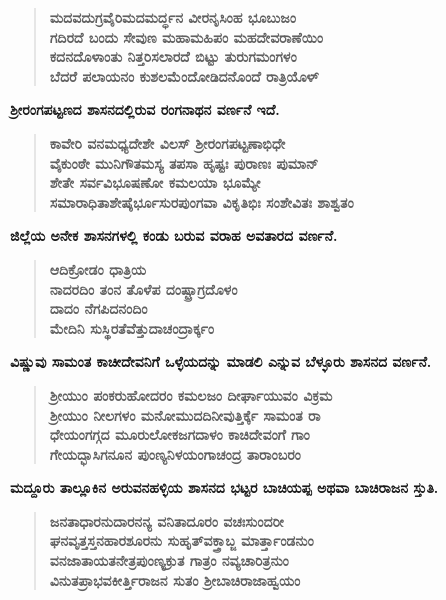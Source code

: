 \begin{verse}
\textbf{ಮದವದುಗ್ರವೈರಿಮದಮರ್ದ್ಧನ ವೀರನೃಸಿಂಹ ಭೂಬುಜಂ \\ ಗದಿರದೆ ಬಂದು ಸೇವುಣ ಮಹಾಮಹಿಪಂ ಮಹದೇವರಾಣೆಯಿಂ \\ ಕದನದೊಳಾಂತು ನಿತ್ತರಿಸಲಾರದೆ ಬಿಟ್ಟು ತುರುಗಮಂಗಳಂ \\ ಬೆದರೆ ಪಲಾಯನಂ ಕುಶಲಮೆಂದೋಡಿದನೊಂದೆ ರಾತ್ರಿಯೊಳ್​}
\end{verse}

\noindent
\textbf{ಶ‍್ರೀರಂಗಪಟ್ಟಣದ ಶಾಸನದಲ್ಲಿರುವ ರಂಗನಾಥನ ವರ್ಣನೆ ಇದೆ.}

\begin{verse}
\textbf{ಕಾವೇರಿ ವನಮಧ್ಯದೇಶೇ ವಿಲಸ್​ ಶ‍್ರೀರಂಗಪಟ್ಟಣಾಭಿಧೇ \\ ವೈಕುಂಠೇ ಮುನಿಗೌತಮಸ್ಯ ತಪಸಾ ಹೃಷ್ಟಃ ಪುರಾಣಃ ಪುಮಾನ್​ \\ ಶೇತೇ ಸರ್ವವಿಭೂಷಣೋ ಕಮಲಯಾ ಭೂಮ್ಯೇ \\ ಸಮಾರಾಧಿತಾಶೇಷೈರ್ಭೂಸುರಪುಂಗವಾ ವಿಕೃತಿಭಿಃ ಸಂಶೇವಿತಃ ಶಾಶ್ವತಂ}
\end{verse}

\noindent
\textbf{ಜಿಲ್ಲೆಯ ಅನೇಕ ಶಾಸನಗಳಲ್ಲಿ ಕಂಡು ಬರುವ ವರಾಹ ಅವತಾರದ ವರ್ಣನೆ.}

\begin{verse}
\textbf{ಆದಿಕ್ರೋಡಂ ಧಾತ್ರಿಯ \\ ನಾದರದಿಂ ತಂನ ತೊಳೆಪ ದಂಷ್ಟ್ರಾಗ್ರದೊಳಂ \\ ದಾದಂ ನೆಗಪಿದನಂದಿಂ \\ ಮೇದಿನಿ ಸುಸ್ಥಿರತೆವೆತ್ತುದಾಚಂದ್ರಾರ್ಕ್ಕಂ}
\end{verse}

\noindent
\textbf{ವಿಷ್ಣುವು ಸಾಮಂತ ಕಾಚೀದೇವನಿಗೆ ಒಳ್ಳೆಯದನ್ನು ಮಾಡಲಿ ಎನ್ನುವ ಬೆಳ್ಳೂರು ಶಾಸನದ ವರ್ಣನೆ.}

\begin{verse}
\textbf{ಶ‍್ರೀಯುಂ ಪಂಕರುಹೋದರಂ ಕಮಲಜಂ ದೀರ್ಘಾಯುವಂ ವಿಕ್ರಮ \\ ಶ‍್ರೀಯುಂ ನೀಲಗಳಂ ಮನೋಮುದದಿನೀವುತ್ತಿರ್ಕ್ಕೆ ಸಾಮಂತ ರಾ \\ ಧೇಯಂಗಗ್ಗದ ಮೂರುಲೋಕಜಗದಾಳಂ ಕಾಚಿದೇವಂಗೆ ಗಾಂ \\ ಗೇಯದ್ಭಾಸಿಗನೂನ ಪುಂಣ್ಯನಿಳಯಂಗಾಚಂದ್ರ ತಾರಾಂಬರಂ}
\end{verse}

\noindent
\textbf{ಮದ್ದೂರು ತಾಲ್ಲೂಕಿನ ಅರುವನಹಳ್ಳಿಯ ಶಾಸನದ ಭಟ್ಟರ ಬಾಚಿಯಪ್ಪ ಅಥವಾ ಬಾಚಿರಾಜನ ಸ್ತುತಿ.}

\begin{verse}
\textbf{ಜನತಾಧಾರನುದಾರನನ್ಯ ವನಿತಾದೂರಂ ವಚಃಸುಂದರೀ\\ ಘನವೃತ್ತಸ್ತನಹಾರಶೂರನು ಸುಹೃತ್​ವಕ್ತ್ರಾಬ್ಜ ಮಾರ್ತ್ತಾಂಡನುಂ \\ ವನಜಾತಾಯತನೇತ್ರಪುಂಣ್ಯಕ್ರುತ ಗಾತ್ರಂ ನವ್ಯಚಾರಿತ್ರನುಂ \\ ವಿನುತಪ್ರಾಭವಕೀರ್ತ್ತಿರಾಜನ ಸುತಂ ಶ‍್ರೀಬಾಚಿರಾಜಾಹ್ವಯಂ}
\end{verse}

